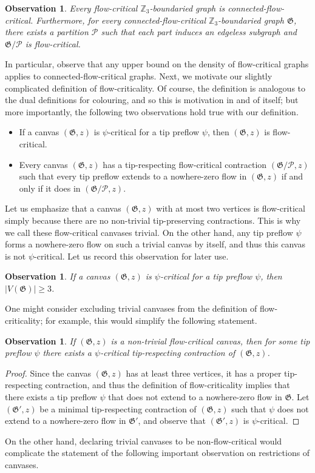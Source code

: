 \documentclass{article}
\newcommand{\Z}{\mathbb{Z}_3}
\newcommand{\PP}{\mathcal{P}}
\newcommand\g{\mathfrak{G}}
\newtheorem{observation}[theorem]{Observation}
\begin{document}
\begin{observation}
\label{obs:connectedtoindependent}
    Every flow-critical $\Z$-boundaried graph is connected-flow-critical. Furthermore, for every connected-flow-critical $\Z$-boundaried graph $\g$, there exists a partition $\PP$ such that each part induces an edgeless subgraph and $\g / \PP$ is flow-critical.
\end{observation}

In particular, observe that any upper bound on the density of flow-critical
graphs applies to connected-flow-critical graphs. Next, we motivate our
slightly complicated definition of flow-criticality. Of course, the definition
is analogous to the dual definitions for colouring, and so this is motivation in and of
itself; but more importantly, the following two observations hold true with our
definition.

\begin{itemize}
\item If a canvas $(\g,z)$ is $\psi$-critical for a tip preflow $\psi$, then $(\g,z)$ is flow-critical.
\item Every canvas $(\g,z)$ has a tip-respecting flow-critical contraction $(\g/\PP,z)$ such that
every tip preflow extends to a nowhere-zero flow in $(\g,z)$ if and only if it does in $(\g/\PP,z)$.
\end{itemize}


Let us emphasize that a canvas $(\g,z)$ with at most two vertices is flow-critical simply because there are no non-trivial tip-preserving contractions. This is why we call these flow-critical canvases trivial.  On the other hand, any tip preflow $\psi$
forms a nowhere-zero flow on such a trivial canvas by itself, and thus this canvas is not $\psi$-critical. Let us record this observation for later use. 
\begin{observation}\label{obs-ge3}
If a canvas $(\g,z)$ is $\psi$-critical for a tip preflow $\psi$, then $|V(\g)|\ge 3$.
\end{observation}

  One might consider excluding trivial canvases from the definition of flow-criticality; for example, this would simplify the following statement.
\begin{observation}\label{obs-critopsi}
If $(\g,z)$ is a non-trivial flow-critical canvas, then for some tip preflow $\psi$ there exists a $\psi$-critical tip-respecting contraction of $(\g,z)$.
\end{observation}
\begin{proof}
Since the canvas $(\g,z)$ has at least three vertices, it has a proper tip-respecting contraction, and thus
the definition of flow-criticality implies that there exists a tip preflow $\psi$
that does not extend to a nowhere-zero flow in $\g$.  Let $(\g',z)$ be a minimal tip-respecting contraction
of $(\g,z)$ such that $\psi$ does not extend to a nowhere-zero flow in $\g'$,
and observe that $(\g',z)$ is $\psi$-critical.
\end{proof}
On the other hand, declaring trivial canvases to be non-flow-critical would complicate the statement of the following important observation on restrictions of canvases.
\end{document}
